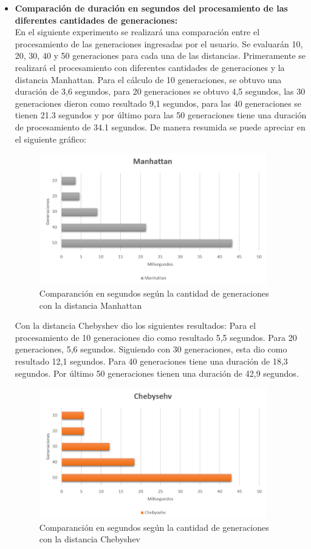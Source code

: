 \documentclass[journal]{IEEEtran}
\begin{document}
\begin{itemize}
	\newpage
	\item{\bf Comparación de duración en segundos del procesamiento de las diferentes cantidades de generaciones:}  \\
	En el siguiente experimento se realizará una comparación entre el procesamiento de las generaciones ingresadas por el usuario. Se evaluarán 10, 20, 30, 40 y 50 generaciones para cada una de las distancias. 
	Primeramente se realizará el procesamiento con diferentes cantidades de generaciones y la distancia Manhattan. Para el cálculo de 10 generaciones, se obtuvo una duración de 3,6 segundos, para 20 generaciones se obtuvo 4,5 segundos, las 30 generaciones dieron como resultado 9,1 segundos,  para las 40 generaciones se tienen 21.3 segundos y por último para las 50 generaciones tiene una duración de procesamiento de 34.1 segundos. De manera resumida se puede apreciar en el siguiente gráfico:
	
	\begin{figure}[h]
		\centering
		\includegraphics[width = 280pt]{manhattan.png}
		\caption{Comparanción en segundos según la cantidad de generaciones con la distancia Manhattan }
	\end{figure}
	
	
	Con la distancia Chebyshev dio los siguientes resultados: Para el procesamiento de 10 generaciones dio como resultado 5,5 segundos. Para 20 generaciones, 5,6 segundos. Siguiendo con 30 generaciones, esta dio como resultado 12,1 segundos. Para 40 generaciones tiene una duración de 18,3 segundos. Por último 50 generaciones tienen una duración de 42,9 segundos.
	
	\begin{figure}[h]
		\centering
		\includegraphics[width = 280pt]{chebyshev.png}
		\caption{Comparanción en segundos según la cantidad de generaciones con la distancia Chebyshev }
	\end{figure}
	

\end{itemize}
\end{document}
